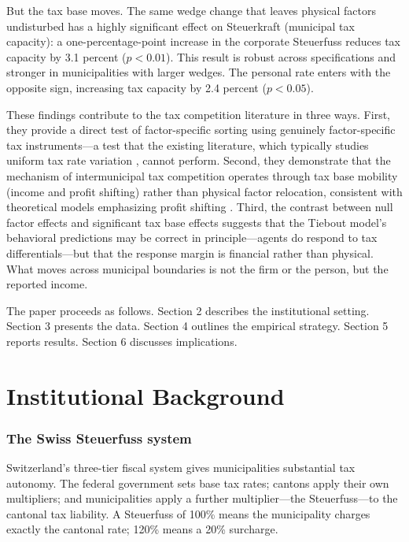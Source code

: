 \documentclass[12pt]{article}
\begin{document}
But the tax base moves. The same wedge change that leaves physical factors undisturbed has a highly significant effect on Steuerkraft (municipal tax capacity): a one-percentage-point increase in the corporate Steuerfuss reduces tax capacity by 3.1 percent ($p < 0.01$). This result is robust across specifications and stronger in municipalities with larger wedges. The personal rate enters with the opposite sign, increasing tax capacity by 2.4 percent ($p < 0.05$).

These findings contribute to the tax competition literature in three ways. First, they provide a direct test of factor-specific sorting using genuinely factor-specific tax instruments---a test that the existing literature, which typically studies uniform tax rate variation \citep{brulhart2012, schmidheiny2006}, cannot perform. Second, they demonstrate that the mechanism of intermunicipal tax competition operates through tax base mobility (income and profit shifting) rather than physical factor relocation, consistent with theoretical models emphasizing profit shifting \citep{keen2006, hines2010}. Third, the contrast between null factor effects and significant tax base effects suggests that the Tiebout model's behavioral predictions may be correct in principle---agents do respond to tax differentials---but that the response margin is financial rather than physical. What moves across municipal boundaries is not the firm or the person, but the reported income.

The paper proceeds as follows. Section 2 describes the institutional setting. Section 3 presents the data. Section 4 outlines the empirical strategy. Section 5 reports results. Section 6 discusses implications.


\section{Institutional Background}

\subsubsection*{The Swiss Steuerfuss system} Switzerland's three-tier fiscal system gives municipalities substantial tax autonomy. The federal government sets base tax rates; cantons apply their own multipliers; and municipalities apply a further multiplier---the Steuerfuss---to the cantonal tax liability. A Steuerfuss of 100\% means the municipality charges exactly the cantonal rate; 120\% means a 20\% surcharge.
\end{document}
